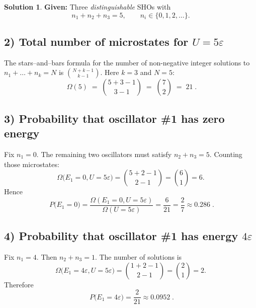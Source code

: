 \documentclass[12pt]{article}
\theoremstyle{definition} %
\newtheorem{solution}{Solution}
\theoremstyle{plain} %
\begin{document}
\begin{solution}
  \textbf{Given:} Three \emph{distinguishable} SHOs with  
  \[
  n_1+n_2+n_3 = 5, \qquad n_i \in \{0,1,2,\dots\}.
  \]
  
  \subsection*{2) Total number of microstates for $U = 5\varepsilon$}
  
  The stars–and–bars formula for the number of non-negative integer
  solutions to \(n_1+\dots+n_k=N\) is
  \(\displaystyle \binom{N+k-1}{k-1}\).
  Here \(k=3\) and \(N=5\):
  \[
  \boxed{\;
  \Omega(5) \;=\; \binom{5+3-1}{3-1}
             \;=\; \binom{7}{2}
             \;=\; 21
  \;} .
  \]
  
  \subsection*{3) Probability that oscillator \#1 has zero energy}
  
  Fix \(n_1 = 0\).  
  The remaining two oscillators must satisfy \(n_2+n_3=5\).
  Counting those microstates:
  \[
  \Omega\!\bigl(E_1=0,U=5\varepsilon\bigr)
    = \binom{5+2-1}{2-1}
    = \binom{6}{1}
    = 6.
  \]
  Hence
  \[
  \boxed{\;
  P\!\bigl(E_1=0\bigr)
    = \frac{\Omega(E_1=0,U=5\varepsilon)}{\Omega(U=5\varepsilon)}
    = \frac{6}{21}
    = \frac{2}{7}
    \approx 0.286
  \;} .
  \]
  
  \subsection*{4) Probability that oscillator \#1 has energy $4\varepsilon$}
  
  Fix \(n_1 = 4\).  
  Then \(n_2+n_3 = 1\).  The number of solutions is
  \[
  \Omega\!\bigl(E_1=4\varepsilon,U=5\varepsilon\bigr)
    = \binom{1+2-1}{2-1}
    = \binom{2}{1}
    = 2.
  \]
  Therefore
  \[
  \boxed{\;
  P\!\bigl(E_1 = 4\varepsilon\bigr)
    = \frac{2}{21}
    \approx 0.0952
  \;} .
  \]
  \end{solution}
\end{document}
